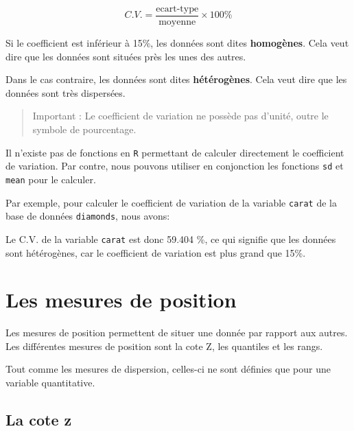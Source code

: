 \documentclass[]{book}
\newenvironment{Shaded}{\begin{snugshade}}{\end{snugshade}}
\newcommand{\DecValTok}[1]{\textcolor[rgb]{0.00,0.00,0.81}{#1}}
\newcommand{\KeywordTok}[1]{\textcolor[rgb]{0.13,0.29,0.53}{\textbf{#1}}}
\newcommand{\NormalTok}[1]{#1}
\newcommand{\OperatorTok}[1]{\textcolor[rgb]{0.81,0.36,0.00}{\textbf{#1}}}
\theoremstyle{definition}
\theoremstyle{definition}
\theoremstyle{definition}
\theoremstyle{remark}
\begin{document}
\begin{equation}
C.V. = \dfrac{\text{ecart-type}}{\text{moyenne}}\times 100\%
\end{equation}

Si le coefficient est inférieur à 15\%, les données sont dites
\textbf{homogènes}. Cela veut dire que les données sont situées près les
unes des autres.

Dans le cas contraire, les données sont dites \textbf{hétérogènes}. Cela
veut dire que les données sont très dispersées.

\begin{quote}
Important : Le coefficient de variation ne possède pas d'unité, outre le
symbole de pourcentage.
\end{quote}

Il n'existe pas de fonctions en \texttt{R} permettant de calculer
directement le coefficient de variation. Par contre, nous pouvons
utiliser en conjonction les fonctions \texttt{sd} et \texttt{mean} pour
le calculer.

Par exemple, pour calculer le coefficient de variation de la variable
\texttt{carat} de la base de données \texttt{diamonds}, nous avons:

\begin{Shaded}
\end{Shaded}

Le C.V. de la variable \texttt{carat} est donc 59.404 \%, ce qui
signifie que les données sont hétérogènes, car le coefficient de
variation est plus grand que 15\%.

\hypertarget{les-mesures-de-position}{%
\section{Les mesures de position}\label{les-mesures-de-position}}

Les mesures de position permettent de situer une donnée par rapport aux
autres. Les différentes mesures de position sont la cote Z, les
quantiles et les rangs.

Tout comme les mesures de dispersion, celles-ci ne sont définies que
pour une variable quantitative.

\hypertarget{la-cote-z}{%
\subsection{La cote z}\label{la-cote-z}}
\end{document}
